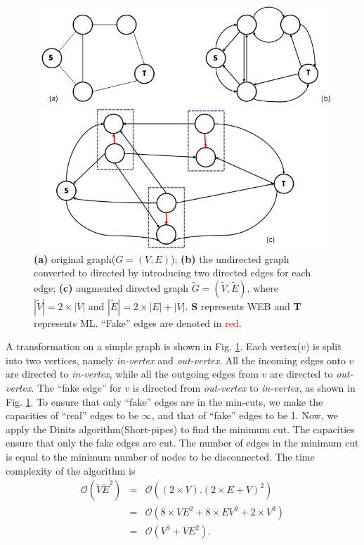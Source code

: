 \documentclass[assign]{article}
\newcommand{\Oo}{\mathcal{O}}
\begin{document}
\vspace{-10pt}
\begin{figure}[!hbt]
\begin{center}
  \includegraphics[width=0.78\linewidth]{fig3.png}
\end{center}
\caption{\small{ \textbf{(a)} original graph($G=(V,E)$); \textbf{(b)} the undirected graph converted to directed by introducing two directed edges for each edge;
\textbf{(c)} augmented directed graph $\tilde{G} = (\tilde{V}, \tilde{E})$, where $|\tilde{V}| = 2\times|V|$  and $|\tilde{E}| = 2\times|E| + |V|$. \textbf{S} represents WEB and \textbf{T} represents ML. ``Fake'' edges are denoted in \textcolor{red}{red}.
}}
\label{fig3}
\end{figure}

\par A transformation on a simple graph is shown in Fig. \ref{fig3}.  Each vertex($v$) is split into two vertices, namely \emph{in-vertex} and \emph{out-vertex}. All the incoming edges onto $v$ are directed to \emph{in-vertex}, while all the outgoing edges from $v$ are directed to \emph{out-vertex}. The ``fake edge'' for $v$ is directed from \emph{out-vertex} to \emph{in-vertex}, as shown in Fig. \ref{fig3}. To ensure that only ``fake'' edges are in the min-cuts, we make the capacities of ``real'' edges to be $\infty$, and that of ``fake'' edges to be 1. Now, we apply the Dinits algorithm(Short-pipes) to find the minimum cut. The capacities ensure that only the fake edges are cut. The number of edges in the minimum cut is equal to the minimum number of nodes to be disconnected. 
The time complexity of the algorithm is 
\begin{eqnarray*}
 \Oo(\tilde{V}\tilde{E}^2) &=& \Oo((2\times V) . (2\times E  + V)^2)  \\
                                      &=& \Oo(8\times VE^2 + 8\times EV^2 + 2\times V^3) \\
					 &=& \Oo(V^3 + VE^2).
\end{eqnarray*}
\end{document}
